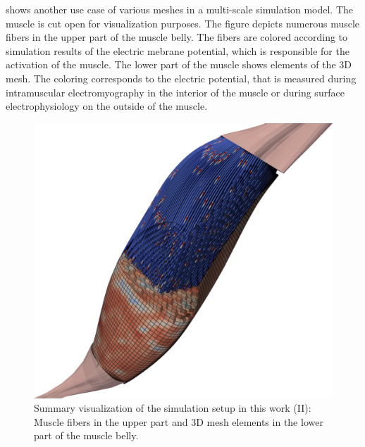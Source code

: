  shows another use case of various meshes in a multi-scale simulation model. The muscle is cut open for visualization purposes. The figure depicts numerous muscle fibers in the upper part of the muscle belly. The fibers are colored according to simulation results of the electric mebrane potential, which  is responsible for the activation of the muscle. The lower part of the muscle shows elements of the 3D mesh. The coloring corresponds to the electric potential, that is measured during intramuscular electromyography in the interior of the muscle or during surface electrophysiology on the outside of the muscle.

\begin{figure}
  \centering%
  \includegraphics[width=\textwidth]{images/parallel_fiber_estimation/muscle_meshes_raytrace.png}%
  \caption{Summary visualization of the simulation setup in this work (II): Muscle fibers in the upper part and 3D mesh elements in the lower part of the muscle belly.}%
  \label{fig:muscle_meshes_raytrace}%
\end{figure}
\clearpage





